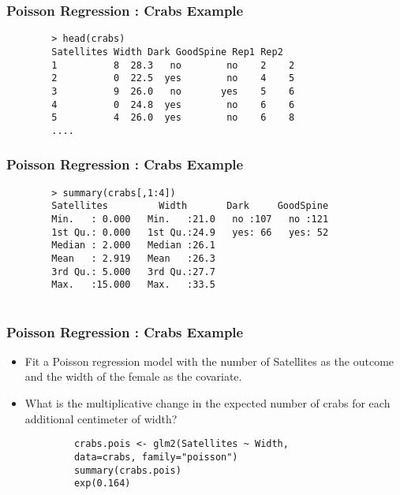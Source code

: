 \documentclass[MASTER.tex]{subfiles}
\begin{document}
	\begin{frame}[fragile]
		\frametitle{Poisson Regression :  Crabs Example}
		\begin{verbatim}
		> head(crabs)
		Satellites Width Dark GoodSpine Rep1 Rep2
		1          8  28.3   no        no    2    2
		2          0  22.5  yes        no    4    5
		3          9  26.0   no       yes    5    6
		4          0  24.8  yes        no    6    6
		5          4  26.0  yes        no    6    8
		....
		\end{verbatim}
	\end{frame}
	\begin{frame}[fragile]
		\frametitle{Poisson Regression :  Crabs Example}
		\begin{verbatim}
		> summary(crabs[,1:4])
		Satellites         Width       Dark     GoodSpine
		Min.   : 0.000   Min.   :21.0   no :107   no :121  
		1st Qu.: 0.000   1st Qu.:24.9   yes: 66   yes: 52  
		Median : 2.000   Median :26.1                      
		Mean   : 2.919   Mean   :26.3                      
		3rd Qu.: 5.000   3rd Qu.:27.7                      
		Max.   :15.000   Max.   :33.5                
		
		\end{verbatim}
	\end{frame}
	\begin{frame}[fragile]
		\frametitle{Poisson Regression :  Crabs Example}
		\begin{itemize}
		\item Fit a Poisson regression model with the number of Satellites as the outcome and the width of the female as the covariate. 
		
		\item What is the multiplicative change in the expected number of crabs for each additional centimeter of width?
		\end{itemize}
		\begin{framed}
			\begin{verbatim}
			crabs.pois <- glm2(Satellites ~ Width, 
			data=crabs, family="poisson")
			summary(crabs.pois)
			exp(0.164)
			\end{verbatim}
		\end{framed}
		
	\end{frame}
\end{document}
